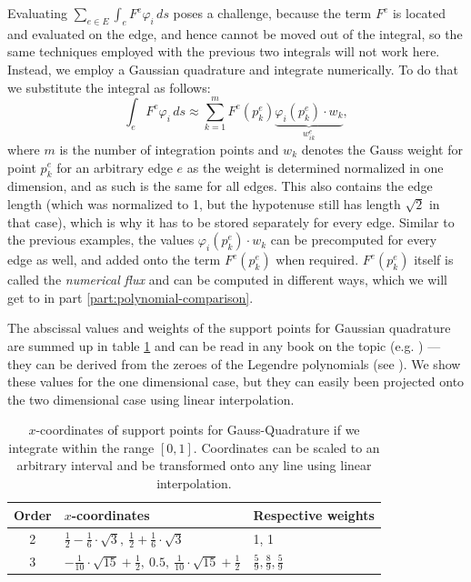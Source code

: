 \documentclass{article}
\renewcommand{\phi}{\varphi}
\begin{document}
Evaluating $\sum_{e \in E} \int_{e} F^e \phi_i \, ds$ poses a challenge, because the term $F^e$ is located and evaluated on the edge, and hence cannot be moved out of the integral, so the same techniques employed with the previous two integrals will not work here. Instead, we employ a Gaussian quadrature and integrate numerically. To do that we substitute the integral as follows:
\begin{equation}
  \int_{e} F^e \phi_i \, ds \approx \sum_{k=1}^{m} F^e\left(p_k^e\right) \underbrace{\phi_i\left(p_k^e\right) \cdot w_k}_{w_{ik}^e},
\end{equation}
where $m$ is the number of integration points and $w_k$ denotes the Gauss weight for point $p_k^e$ for an arbitrary edge $e$ as the weight is determined normalized in one dimension, and as such is the same for all edges. This also contains the edge length (which was normalized to 1, but the hypotenuse still has length $\sqrt{2}$ in that case), which is why it has to be stored separately for every edge. Similar to the previous examples, the values $\phi_i\left(p_k^e\right) \cdot w_k$ can be precomputed for every edge as well, and added onto the term $F^e\left(p_k^e\right)$ when required. $F^e\left(p_k^e\right)$ itself is called the \emph{numerical flux} and can be computed in different ways, which we will get to in part \ref{part:polynomial-comparison}.

The abscissal values and weights of the support points for Gaussian quadrature are summed up in table \ref{tab:x-coordinates-gauss-quadrature} and can be read in any book on the topic (e.g. \cite{hans2009schwarz}) --- they can be derived from the zeroes of the Legendre polynomials (see \cite{abramowitzstegun1964handbook}). We show these values for the one dimensional case, but they can easily been projected onto the two dimensional case using linear interpolation.

\begin{table}[ht]
  \renewcommand\arraystretch{1.5}
  \centering
  \begin{tabular}[ht]{cll}
    Order & $x$-coordinates & Respective weights \\
    \hline
    2 & $\frac{1}{2}-\frac{1}{6}\cdot \sqrt{3},\  \frac{1}{2}+\frac{1}{6}\cdot \sqrt{3}$ & 1, 1\\
    3 & $-\frac{1}{10}\cdot \sqrt{15}+\frac{1}{2} ,\  0.5,\  \frac{1}{10}\cdot \sqrt{15}+\frac{1}{2}$ & $\frac{5}{9}, \frac{8}{9}, \frac{5}{9}$ \\
    \hline
  \end{tabular}
  \caption{$x$-coordinates of support points for Gauss-Quadrature if we integrate within the range $\left[ 0,1 \right]$. Coordinates can be scaled to an arbitrary interval and be transformed onto any line using linear interpolation.}
  \label{tab:x-coordinates-gauss-quadrature}
\end{table}
\end{document}

